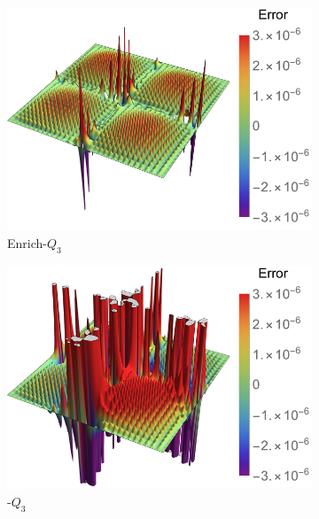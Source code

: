 \begin{figure}
	\center
	\captionsetup[subfigure]{labelformat=empty}
	\begin{subfigure}[t]{.45\linewidth}
		\center
		\includegraphics[scale=.52]{four_patch_poisson_op_contour}
		\caption{Enrich-$Q_3$}
	\end{subfigure}
	\begin{subfigure}[t]{.45\linewidth}
		\center
		\includegraphics[scale=.52]{four_patch_poisson_Bezier_contour}
		\caption{\Bezier-$Q_3$}
	\end{subfigure}\\
	\center
	\begin{subfigure}[t]{.45\linewidth}
		\center

\end{subfigure}
\end{figure}
